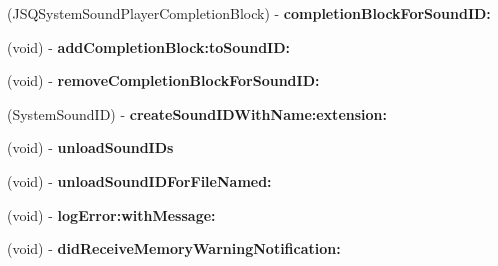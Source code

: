 \begin{DoxyCompactItemize}
\item 
\hypertarget{category_j_s_q_system_sound_player_07_08_afb88ac823f3b562fc364646224c681c4}{}(J\+S\+Q\+System\+Sound\+Player\+Completion\+Block) -\/ {\bfseries completion\+Block\+For\+Sound\+I\+D\+:}\label{category_j_s_q_system_sound_player_07_08_afb88ac823f3b562fc364646224c681c4}

\item 
\hypertarget{category_j_s_q_system_sound_player_07_08_a83d44c62d626b7a18537f1e3d7146ad2}{}(void) -\/ {\bfseries add\+Completion\+Block\+:to\+Sound\+I\+D\+:}\label{category_j_s_q_system_sound_player_07_08_a83d44c62d626b7a18537f1e3d7146ad2}

\item 
\hypertarget{category_j_s_q_system_sound_player_07_08_a366d7a80ecca2d2680a7c327111a719f}{}(void) -\/ {\bfseries remove\+Completion\+Block\+For\+Sound\+I\+D\+:}\label{category_j_s_q_system_sound_player_07_08_a366d7a80ecca2d2680a7c327111a719f}

\item 
\hypertarget{category_j_s_q_system_sound_player_07_08_a9dfaf892032e97df81376ee8091fc1d8}{}(System\+Sound\+I\+D) -\/ {\bfseries create\+Sound\+I\+D\+With\+Name\+:extension\+:}\label{category_j_s_q_system_sound_player_07_08_a9dfaf892032e97df81376ee8091fc1d8}

\item 
\hypertarget{category_j_s_q_system_sound_player_07_08_a0538089d87bdd0ffb6f9df64bd727b29}{}(void) -\/ {\bfseries unload\+Sound\+I\+Ds}\label{category_j_s_q_system_sound_player_07_08_a0538089d87bdd0ffb6f9df64bd727b29}

\item 
\hypertarget{category_j_s_q_system_sound_player_07_08_a7878edbd88a52c934d720a56fd529c7d}{}(void) -\/ {\bfseries unload\+Sound\+I\+D\+For\+File\+Named\+:}\label{category_j_s_q_system_sound_player_07_08_a7878edbd88a52c934d720a56fd529c7d}

\item 
\hypertarget{category_j_s_q_system_sound_player_07_08_a1e53a7df4c0a8dba033dc7ccda699f61}{}(void) -\/ {\bfseries log\+Error\+:with\+Message\+:}\label{category_j_s_q_system_sound_player_07_08_a1e53a7df4c0a8dba033dc7ccda699f61}

\item 
\hypertarget{category_j_s_q_system_sound_player_07_08_a8d8412971f2d8586bbecfe93f6e72fc7}{}(void) -\/ {\bfseries did\+Receive\+Memory\+Warning\+Notification\+:}\label{category_j_s_q_system_sound_player_07_08_a8d8412971f2d8586bbecfe93f6e72fc7}

\end{DoxyCompactItemize}
